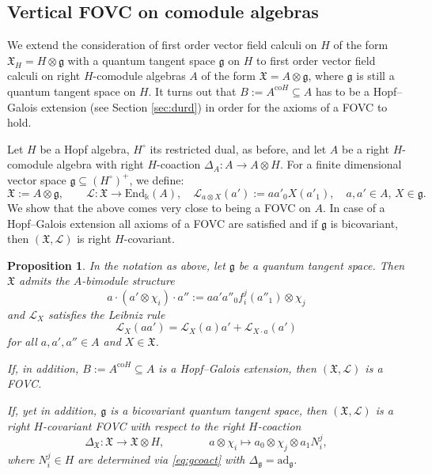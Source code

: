 \documentclass{article}
\newtheorem{proposition}[thm]{Proposition}
\theoremstyle{definition}
\newcommand{\Chi}{{\mathfrak{X}}}
\newcommand{\fg}{{\mathfrak{g}}}
\begin{document}
\subsection{Vertical FOVC on comodule algebras}\label{fovc-ca-sec}

We extend the consideration of first order vector field calculi on $H$ of the form $\mathfrak{X}_H=H\otimes\mathfrak{g}$ with a quantum tangent space $\mathfrak{g}$ on $H$ to first order vector field calculi on right $H$-comodule algebras $A$ of the form $\mathfrak{X}=A\otimes\mathfrak{g}$, where $\mathfrak{g}$ is still a quantum tangent space on $H$. It turns out that $B:=A^{\mathrm{co}H}\subseteq A$ has to be a Hopf--Galois extension (see Section \ref{sec:durd}) in order for the axioms of a FOVC to hold.

Let $H$ be a Hopf algebra, $H^\circ$ its restricted
dual, as before, and let $A$ be a right $H$-comodule algebra with right $H$-coaction $\Delta_A\colon A\to A\otimes H$. For a finite dimensional vector space 
$\fg \subseteq (H^\circ)^+$, we define:
\begin{equation}
	\Chi:=A \otimes \fg, \qquad \mathscr{L}\colon\Chi \to  \mathrm{End}_\Bbbk(A),
	\quad \mathscr{L}_{a \otimes X}(a'):=aa'_0X(a'_1), \quad a,a' \in A, \, X \in \fg. 
\end{equation}
We show that the above comes very close to being a FOVC on $A$. In case of a Hopf--Galois extension all axioms of a FOVC are satisfied 
and if $\mathfrak{g}$ is bicovariant, then $(\mathfrak{X},\mathscr{L})$ is right $H$-covariant.

\begin{proposition}\label{prop:hopf}
	In the notation as above, let $\fg$ be a quantum tangent space. Then $\Chi$ admits the $A$-bimodule structure
	\begin{equation}\label{eq:bimod}
		a\cdot(a'\otimes\chi_i)\cdot a''
		:=aa'a''_0f_i^j(a''_1)\otimes\chi_j
	\end{equation}
	and $\mathscr{L}_{X}$ satisfies the Leibniz rule 
	\begin{equation}
		\mathscr{L}_{X}(aa')
		=\mathscr{L}_X(a)a'
		+\mathscr{L}_{X\cdot a}(a')
	\end{equation}
	for all $a,a',a''\in A$ and $X \in \Chi$.
	
	If, in addition, $B:=A^{\mathrm{co}H}\subseteq A$ is a Hopf--Galois extension, then $(\mathfrak{X},\mathscr{L})$ is a FOVC.
	
	If, yet in addition, $\mathfrak{g}$ is a bicovariant quantum tangent space, then $(\mathfrak{X},\mathscr{L})$ is a right $H$-covariant FOVC with respect to the right $H$-coaction
	\begin{equation}
		\Delta_\mathfrak{X}\colon\mathfrak{X}\to\mathfrak{X}\otimes H,\qquad\qquad a\otimes\chi_i\mapsto a_0\otimes\chi_j\otimes a_1N_i^j,
	\end{equation}
	where $N_i^j\in H$ are determined via \eqref{eq:gcoact} with $\Delta_\mathfrak{g}=\mathrm{ad}_\mathfrak{g}$.
\end{proposition}
\end{document}
